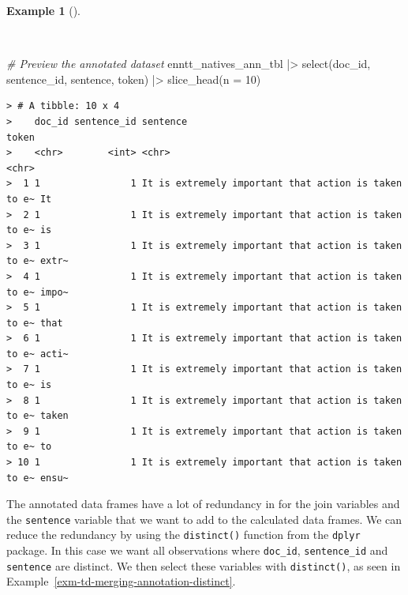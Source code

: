 \documentclass[
  letterpaper,
  DIV=11,
  numbers=noendperiod]{scrreprt}
\newenvironment{Shaded}{\begin{snugshade}}{\end{snugshade}}
\newcommand{\AttributeTok}[1]{\textcolor[rgb]{0.00,0.00,0.00}{#1}}
\newcommand{\CommentTok}[1]{\textcolor[rgb]{0.00,0.00,0.00}{\textit{#1}}}
\newcommand{\DecValTok}[1]{\textcolor[rgb]{0.00,0.00,0.00}{#1}}
\newcommand{\FunctionTok}[1]{\textcolor[rgb]{0.00,0.00,0.00}{#1}}
\newcommand{\NormalTok}[1]{\textcolor[rgb]{0.00,0.00,0.00}{#1}}
\newcommand{\SpecialCharTok}[1]{\textcolor[rgb]{0.00,0.00,0.00}{#1}}
\theoremstyle{definition}
\newtheorem{example}{Example}[chapter]
\theoremstyle{remark}
\begin{document}
\begin{example}[]\protect\hypertarget{exm-td-merging-join-prepped-syn-comp-ann}{}\label{exm-td-merging-join-prepped-syn-comp-ann}

~

\begin{Shaded}
\begin{Highlighting}[]
\CommentTok{\# Preview the annotated dataset}
\NormalTok{enntt\_natives\_ann\_tbl }\SpecialCharTok{|\textgreater{}}
  \FunctionTok{select}\NormalTok{(doc\_id, sentence\_id, sentence, token) }\SpecialCharTok{|\textgreater{}}
  \FunctionTok{slice\_head}\NormalTok{(}\AttributeTok{n =} \DecValTok{10}\NormalTok{)}
\end{Highlighting}
\end{Shaded}

\begin{verbatim}
> # A tibble: 10 x 4
>    doc_id sentence_id sentence                                             token
>    <chr>        <int> <chr>                                                <chr>
>  1 1                1 It is extremely important that action is taken to e~ It   
>  2 1                1 It is extremely important that action is taken to e~ is   
>  3 1                1 It is extremely important that action is taken to e~ extr~
>  4 1                1 It is extremely important that action is taken to e~ impo~
>  5 1                1 It is extremely important that action is taken to e~ that 
>  6 1                1 It is extremely important that action is taken to e~ acti~
>  7 1                1 It is extremely important that action is taken to e~ is   
>  8 1                1 It is extremely important that action is taken to e~ taken
>  9 1                1 It is extremely important that action is taken to e~ to   
> 10 1                1 It is extremely important that action is taken to e~ ensu~
\end{verbatim}

\end{example}

The annotated data frames have a lot of redundancy in for the join
variables and the \texttt{sentence} variable that we want to add to the
calculated data frames. We can reduce the redundancy by using the
\texttt{distinct()} function from the \texttt{dplyr} package. In this
case we want all observations where \texttt{doc\_id},
\texttt{sentence\_id} and \texttt{sentence} are distinct. We then select
these variables with \texttt{distinct()}, as seen in
Example~\ref{exm-td-merging-annotation-distinct}.
\end{document}
